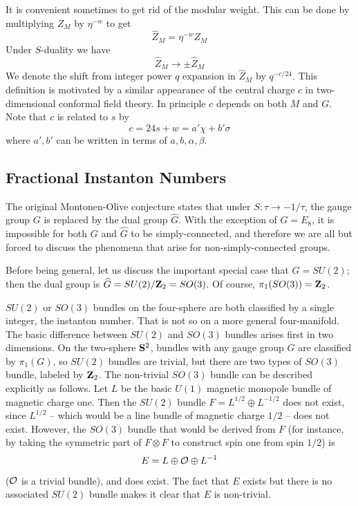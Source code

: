 \documentclass[12pt]{article}
\numberwithin{equation}{section}
\begin{document}

It is convenient sometimes to get
rid of the modular weight.  This can be done by multiplying
$Z_M$ by $\eta^{-w}$ to get
%
$$\hat Z_M =\eta^{-w} Z_M$$
%
Under $S$-duality we have
%
$$\hat Z_M \rightarrow \pm \hat Z_M$$
%
We denote the shift from integer power
$q$ expansion in $\hat Z_M$ by
$q^{-{c/24}}$.
This definition is motivated by a similar appearance of the central charge
$c$ in two-dimensional conformal field theory.
In principle  $c$ depends on both $M$ and $G$.
Note that $c$ is related to $s$ by
%
\begin{equation}
  \label{vardef}
  c=24 s+w=a' \chi+b' \sigma
\end{equation}
%
where $a',b'$ can be written in terms of $a,b,\alpha,\beta $.

\subsection{Fractional Instanton Numbers}

The original Montonen-Olive conjecture states that under
$S:\tau\to -1/\tau$, the gauge group $G$ is replaced by the
dual group $\widehat G$. With the exception of $G=E_8$, it is
impossible for both $G$ and $\widehat G$ to be simply-connected,
and therefore we are all but forced to discuss the phenomena that arise
for non-simply-connected groups.

Before being general, let us discuss the important special case
that $G=SU(2)$; then the dual group is $\hat G=SU(2)/{\bf Z}_2=SO(3)$.
Of course, $\pi_1(SO(3))={\bf Z}_2$.

$SU(2)$ or $SO(3)$ bundles on the four-sphere are both classified by
a single integer, the instanton number.  That is not so on a more
general four-manifold.  The basic difference between $SU(2)$ and $SO(3)$
bundles arises first
in two dimensions.  On the two-sphere ${\bf S}^2$, bundles with
any gauge group $G$ are classified by $\pi_1(G)$, so $SU(2)$ bundles
are trivial, but there are two types of $SO(3)$ bundle, labeled by
${\bf Z}_2$.
The non-trivial $SO(3)$ bundle can be described explicitly as follows.
Let $L$ be the basic $U(1)$ magnetic monopole bundle of magnetic charge
one.  Then the $SU(2)$ bundle $F=L^{1/2}\oplus L^{-1/2}$ does not exist,
since $L^{1/2}$ -- which would be a line bundle of magnetic charge $1/2$ --
does not exist. However, the $SO(3)$ bundle that would be derived
from $F$ (for instance, by taking the symmetric part of $F\otimes F$
to construct spin one from spin $1/2$) is
\begin{equation}
  \label{ponl}
  E=L\oplus {\cal O}\oplus L^{-1}
\end{equation}
(${\cal O}$ is a trivial
bundle), and does exist.  The fact that $E$ exists but there is no associated
$SU(2)$ bundle makes it clear that $E$ is non-trivial.
\end{document}
